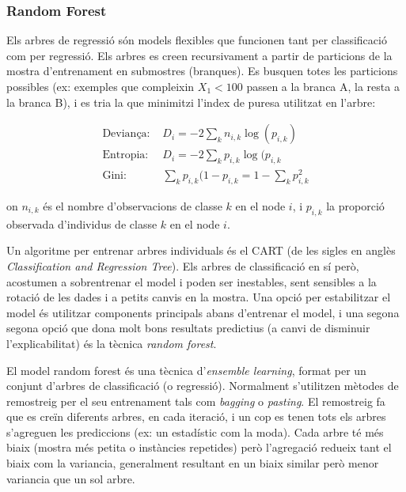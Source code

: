\documentclass[12pt, spanish]{article}
\begin{document}
\subsubsection{Random Forest}

Els arbres de regressió són models flexibles que funcionen tant per classificació com per regressió. Els arbres es creen recursivament a partir de particions de la mostra d'entrenament en submostres (branques). Es busquen totes les particions possibles (ex: exemples que compleixin $X_1 < 100$ passen a la branca A, la resta a la branca B), i es tria la que minimitzi l'index de puresa utilitzat en l'arbre:

\begin{equation} 
\begin{split}
\text{Deviança: } & D_i = -2 \sum_k n_{i,k} \log(p_{i,k}) \\
\text{Entropia: }&  D_i = -2 \sum_k p_{i,k}\log(p_{i,k}\\
\text{Gini: }& \sum_k p_{i,k}(1 - p_{i,k} = 1 - \sum_k p_{i,k}^2
\end{split}
\end{equation}

on $n_{i,k}$ és el nombre d'observacions de classe $k$ en el node $i$, i $p_{i,k}$ la proporció observada d'individus de classe $k$ en el node $i$. 

Un algoritme per entrenar arbres individuals és el CART (de les sigles en anglès \textit{Classification and Regression Tree}). Els arbres de classificació en sí però, acostumen a sobrentrenar el model i poden ser inestables, sent sensibles a la rotació de les dades i a petits canvis en la mostra. Una opció per estabilitzar el model és utilitzar components principals abans d'entrenar el model, i una segona segona opció que dona molt bons resultats predictius (a canvi de disminuir l'explicabilitat) és la tècnica \textit{random forest}.

El model random forest és una tècnica d'\textit{ensemble learning}, format per un conjunt d'arbres de classificació (o regressió). Normalment s'utilitzen mètodes de remostreig per el seu entrenament tals com \textit{bagging} o \textit{pasting}. El remostreig fa que es creïn diferents arbres, en cada iteració, i un cop es tenen tots els arbres s'agreguen les prediccions (ex: un estadístic com la moda). Cada arbre té més biaix (mostra més petita o instàncies repetides) però  l'agregació redueix tant el biaix com la variancia, generalment resultant en un biaix similar però menor variancia que un sol arbre.
\end{document}
